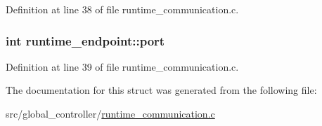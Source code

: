Definition at line 38 of file runtime\-\_\-communication.\-c.

\hypertarget{structruntime__endpoint_a9b80d9b279d096c6f7c6628e60665c00}{
\subsubsection[{port}]{\setlength{\rightskip}{0pt plus 5cm}int runtime\-\_\-endpoint\-::port}}\label{structruntime__endpoint_a9b80d9b279d096c6f7c6628e60665c00}


Definition at line 39 of file runtime\-\_\-communication.\-c.



The documentation for this struct was generated from the following file\-:\begin{DoxyCompactItemize}
\item 
src/global\-\_\-controller/\hyperlink{global__controller_2runtime__communication_8c}{runtime\-\_\-communication.\-c}\end{DoxyCompactItemize}
